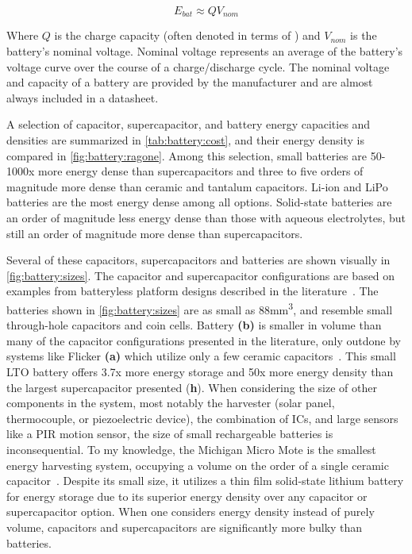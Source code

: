 $$E_{bat} \approx Q V_{nom}$$

\noindent Where $Q$ is the charge capacity (often denoted in terms of \si{\Ah}) and $V_{nom}$ is the battery's nominal voltage. Nominal voltage represents an average of the battery's voltage curve over the course of a charge/discharge cycle. The nominal voltage and capacity of a battery are provided by the manufacturer and are almost always included in a datasheet.

A selection of capacitor, supercapacitor, and battery energy capacities and densities are summarized in \cref{tab:battery:cost}, and their energy density is compared in \cref{fig:battery:ragone}. Among this selection, small batteries are 50-1000x more energy dense than supercapacitors and three to five orders of magnitude more dense than ceramic and tantalum capacitors. Li-ion and LiPo batteries are the most energy dense among all options. Solid-state batteries are an order of magnitude less energy dense than those with aqueous electrolytes, but still an order of magnitude more dense than supercapacitors. 

Several of these capacitors, supercapacitors and batteries are shown visually in \cref{fig:battery:sizes}.
The capacitor and supercapacitor configurations are based on examples from batteryless platform designs described in the literature~\cite{hesterFlicker17, campbellEnergy14,colinReconfigurable18}.
The batteries shown in \cref{fig:battery:sizes} are
as small as 88\si{\milli\meter\cubed}, and resemble small through-hole
capacitors and coin cells. Battery \textbf{(b)} is smaller in volume than many of the capacitor
configurations presented in the literature, only outdone by systems like Flicker \textbf{(a)} which utilize only a few ceramic capacitors~\cite{hesterFlicker17}.
This small LTO battery offers 3.7x 
more energy storage and 50x more energy density than the largest supercapacitor presented (\textbf{h}). When considering the size of other components in the system, most notably the harvester (solar panel, thermocouple, or piezoelectric device), the combination of ICs, and large sensors like a PIR motion sensor, the size of small rechargeable batteries is inconsequential. 
To my knowledge, the Michigan Micro Mote is the smallest energy harvesting system, occupying a volume on the order of a single ceramic capacitor~\cite{lee13modular}. Despite its small size, it utilizes a thin film solid-state lithium battery for energy storage due to its superior energy density over any capacitor or supercapacitor option.
When one considers energy density instead of purely volume, capacitors and supercapacitors are significantly more bulky than batteries.

